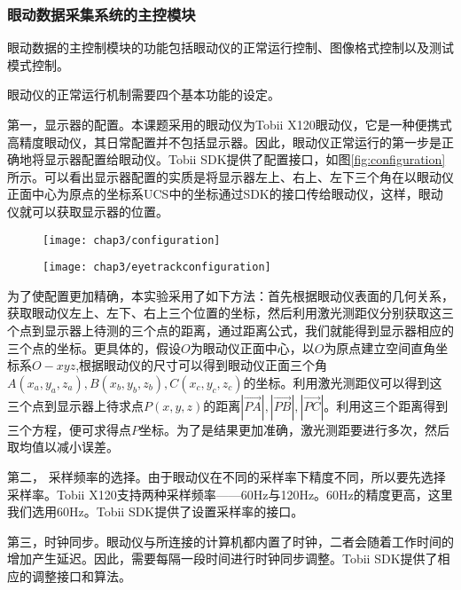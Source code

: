 \subsubsection{眼动数据采集系统的主控模块}
\label{sec:controller}
眼动数据的主控制模块的功能包括眼动仪的正常运行控制、图像格式控制以及测试模式控制。

眼动仪的正常运行机制需要四个基本功能的设定。

第一，显示器的配置。本课题采用的眼动仪为Tobii X120眼动仪，它是一种便携式高精度眼动仪，其日常配置并不包括显示器。因此，眼动仪正常运行的第一步是正确地将显示器配置给眼动仪。Tobii SDK提供了配置接口，如图\ref{fig:configuration}所示\parencite{manualuser}。可以看出显示器配置的实质是将显示器左上、右上、左下三个角在以眼动仪正面中心为原点的坐标系UCS中的坐标通过SDK的接口传给眼动仪，这样，眼动仪就可以获取显示器的位置。
\begin{figure}[!htp]
  \centering
  \texttt{[image: chap3/configuration]}
\end{figure}
\begin{figure}[!htp]
  \centering
  \texttt{[image: chap3/eyetrackconfiguration]}
\end{figure}
为了使配置更加精确，本实验采用了如下方法：首先根据眼动仪表面的几何关系，获取眼动仪左上、左下、右上三个位置的坐标，然后利用激光测距仪分别获取这三个点到显示器上待测的三个点的距离，通过距离公式，我们就能得到显示器相应的三个点的坐标。更具体的，假设$O$为眼动仪正面中心，以$O$为原点建立空间直角坐标系$O-xyz$,根据眼动仪的尺寸可以得到眼动仪正面三个角$A(x_a,y_a,z_a),B(x_b,y_b,z_b),C(x_c,y_c,z_c)$的坐标。利用激光测距仪可以得到这三个点到显示器上待求点$P(x,y,z)$的距离$\left| {\overrightarrow {PA} } \right|,\left| {\overrightarrow {PB} } \right|,\left| {\overrightarrow {PC} } \right|$。利用这三个距离得到三个方程，便可求得点$P$坐标。为了是结果更加准确，激光测距要进行多次，然后取均值以减小误差。

第二， 采样频率的选择。由于眼动仪在不同的采样率下精度不同，所以要先选择采样率。Tobii X120支持两种采样频率——60Hz与120Hz。60Hz的精度更高，这里我们选用60Hz。Tobii SDK提供了设置采样率的接口。

第三，时钟同步。眼动仪与所连接的计算机都内置了时钟，二者会随着工作时间的增加产生延迟。因此，需要每隔一段时间进行时钟同步调整。Tobii SDK提供了相应的调整接口和算法。

